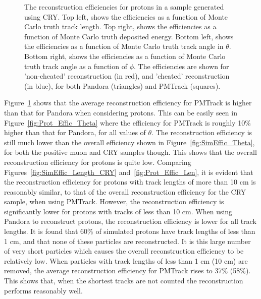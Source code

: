 \begin{figure}[h!]
  \caption[The reconstruction efficiencies for protons in a sample generated using CRY.]
          {The reconstruction efficiencies for protons in a sample generated using CRY. Top left, shows the efficiencies as a function of Monte Carlo truth track length. Top right, shows the efficiencies as a function of Monte Carlo truth deposited energy. Bottom left, shows the efficiencies as a function of Monte Carlo truth track angle in $\theta$. Bottom right, shows the efficiencies as a function of Monte Carlo truth track angle as a function of $\phi$. The efficiencies are shown for 'non-cheated' reconstruction (in red), and 'cheated' reconstruction (in blue), for both Pandora (triangles) and PMTrack (squares).}
  \label{fig:Prot_Effic}
\end{figure}

Figure~\ref{fig:Prot_Effic} shows that the average reconstruction efficiency for PMTrack is higher than that for Pandora when considering protons. This can be easily seen in Figure~\ref{fig:Prot_Effic_Theta} where the efficiency for PMTrack is roughly 10\% higher than that for Pandora, for all values of $\theta$. The reconstruction efficiency is still much lower than the overall efficiency shown in Figure~\ref{fig:SimEffic_Theta}, for both the positive muon and CRY samples though. This shows that the overall reconstruction efficiency for protons is quite low. Comparing Figures~\ref{fig:SimEffic_Length_CRY} and~\ref{fig:Prot_Effic_Len}, it is evident that the reconstruction efficiency for protons with track lengths of more than 10 cm is reasonably similar, to that of the overall reconstruction efficiency for the CRY sample, when using PMTrack. However, the reconstruction efficiency is significantly lower for protons with tracks of less than 10 cm. When using Pandora to reconstruct protons, the reconstruction efficiency is lower for all track lengths. It is found that 60\% of simulated protons have track lengths of less than 1 cm, and that none of these particles are reconstructed. It is this large number of very short particles which causes the overall reconstruction efficiency to be relatively low. When particles with track lengths of less than 1 cm (10 cm) are removed, the average reconstruction efficiency for PMTrack rises to 37\% (58\%). This shows that, when the shortest tracks are not counted the reconstruction performs reasonably well. \\

